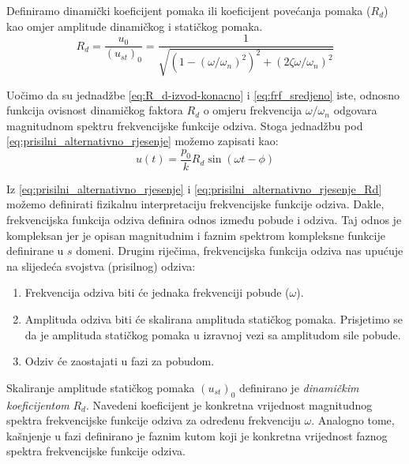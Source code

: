 Definiramo dinamički koeficijent pomaka ili koeficijent povećanja pomaka ($R_d$) kao omjer
amplitude dinamičkog i statičkog pomaka.
\begin{equation}\label{eq:R_d-izvod-konacno}
    R_d = \frac{u_0}{(u_{st})_0}=\frac{1}{\sqrt{(1-(\omega/\omega_n)^2)^2+(2\zeta\omega/\omega_n)^2}}
\end{equation}

Uočimo da su jednadžbe \eqref{eq:R_d-izvod-konacno} i \eqref{eq:frf_sredjeno} iste,
odnosno funkcija ovisnost dinamičkog faktora $R_d$ o omjeru frekvencija
$\omega/\omega_n$ odgovara magnitudnom spektru frekvencijske funkcije odziva. Stoga
jednadžbu pod \eqref{eq:prisilni_alternativno_rjesenje} možemo zapisati kao:
\begin{equation}\label{eq:prisilni_alternativno_rjesenje_Rd}
    u(t)=\frac{p_0}{k}R_d\sin(\omega t - \phi)
\end{equation}

Iz \eqref{eq:prisilni_alternativno_rjesenje} i \eqref{eq:prisilni_alternativno_rjesenje_Rd}
možemo definirati fizikalnu interpretaciju frekvencijske funkcije odziva.
Dakle, frekvencijska funkcija odziva definira odnos između pobude i
odziva. Taj odnos je kompleksan jer je opisan magnitudnim i faznim spektrom
kompleksne funkcije definirane u $s$ domeni. Drugim riječima, frekvencijska funkcija
odziva nas upućuje na slijedeća svojstva (prisilnog) odziva:
\begin{enumerate}
    \item Frekvencija odziva biti će jednaka frekvenciji pobude ($\omega$).
    \item Amplituda odziva biti će skalirana amplituda statičkog pomaka. Prisjetimo
        se da je amplituda statičkog pomaka u izravnoj vezi sa amplitudom sile pobude.
    \item Odziv će zaostajati u fazi za pobudom. 
\end{enumerate}

Skaliranje amplitude statičkog pomaka $(u_{st})_0$ definirano je \textit{dinamičkim
koeficijentom} $R_d$. Navedeni koeficijent je konkretna vrijednost magnitudnog
spektra frekvencijske funkcije odziva za određenu frekvenciju $\omega$. Analogno
tome, kašnjenje u fazi definirano je faznim kutom koji je konkretna vrijednost
faznog spektra frekvencijske funkcije odziva.

